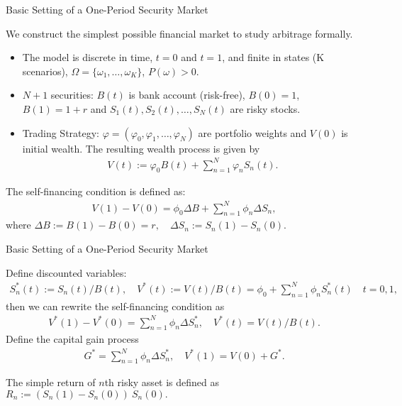 \documentclass{beamer}
\begin{document}
\begin{frame}{Basic Setting of a One-Period Security Market}

    {\footnotesize \footnotesize
     We construct the simplest possible financial market to study arbitrage formally.
     \begin{itemize}
        \item The model is discrete in time, \( t = 0 \) and \( t = 1 \), and finite in states (K scenarios), 
        \( \Omega = \{\omega_1, \ldots, \omega_K\} \), \( P(\omega) > 0 \).
        \item \( N + 1 \) securities: \( B(t) \) is bank account (risk-free), \( B(0) = 1 \), \( B(1) = 1 + r \) and 
        \( S_1(t), S_2(t), \ldots, S_N(t) \) are risky stocks.
        \item Trading Strategy: \( \varphi = (\varphi_0, \varphi_1, \ldots, \varphi_N) \) are portfolio weights 
        and \( V(0) \) is initial wealth. The resulting wealth process is given by
        \begin{align*}
            V(t) := \varphi_0 B(t) + \sum_{n=1}^N \varphi_n S_n(t) .
        \end{align*}
     \end{itemize}
      \par The self-financing condition is defined as:
        \begin{align*}
            V(1) - V(0) = \phi_0 \Delta B + \sum_{n=1}^N \phi_n \Delta S_n,
        \end{align*}
        where $\Delta B := B(1) - B(0)=r, \quad \Delta S_n := S_n(1) - S_n(0).$

    }
\end{frame}

\begin{frame}{Basic Setting of a One-Period Security Market}

    {\footnotesize \footnotesize
    Define discounted variables:
    \begin{align*}
        S_n^*(t) := S_n(t)/B(t), \quad V^*(t) := V(t)/B(t) = \phi_0 + \sum_{n=1}^N \phi_n S_n^*(t) \quad t = 0, 1,
    \end{align*}
    then we can rewrite the self-financing condition as
    \begin{align*}
        V^*(1) - V^*(0) = \sum_{n=1}^N \phi_n \Delta S_n^*, \quad V^*(t) = V(t)/B(t).
    \end{align*}
    Define the capital gain process
    \begin{align*}
        G^* = \sum_{n=1}^N \phi_n \Delta S_n^*, \quad  V^*(1) = V(0) + G^*.
    \end{align*}

    \par The simple return of \( n \)th risky asset is defined as $R_n := (S_n(1) - S_n(0))\ S_n(0).$
    }
\end{frame}
\end{document}

